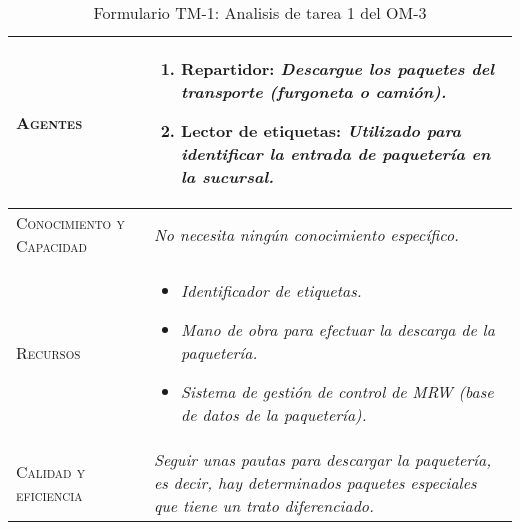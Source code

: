 \begin{table}[H]
{\begin{tabularx}{\textwidth}{|l|X|}
			\hline
			\textsc{Agentes} & 
				\begin{enumerate}
					\item \textbf{Repartidor:} \textit{Descargue los paquetes del transporte (furgoneta o camión).}
					\item \textbf{Lector de etiquetas:} \textit{Utilizado para identificar la entrada de paquetería en la sucursal.}
				\end{enumerate} \\
			\hline
			\textsc{Conocimiento y Capacidad} & \textit{No necesita ningún conocimiento específico.} \\
			\hline
			\textsc{Recursos} & 
				\begin{itemize}
					\item \textit{Identificador de etiquetas.}
					\item \textit{Mano de obra para efectuar la descarga de la paquetería.}
					\item \textit{Sistema de gestión de control de MRW (base de datos de la paquetería).}
				\end{itemize} \\
			\hline
			\textsc{Calidad y eficiencia} & \textit{Seguir unas pautas para descargar la paquetería, es decir, hay determinados paquetes especiales que tiene un trato diferenciado.} \\
			\hline
		\end{tabularx}
	}
	\caption{\label{tab:TM1T1}Formulario TM-1: Analisis de tarea 1 del OM-3}
\end{table} 

